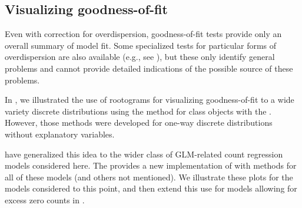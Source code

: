 \documentclass[11pt]{book}\usepackage[]{graphicx}\usepackage[]{color}
\begin{document}
\subsection{Visualizing goodness-of-fit}\label{sec:glm-visfit}

Even with correction for overdispersion, goodness-of-fit tests provide only an overall
summary of model fit.  Some specialized tests for particular forms of overdispersion
are also available (e.g., see \citet[]{CameronTrivedi:1998}),
but these only identify general problems and cannot provide detailed indications of
the possible source of these problems.

In , we illustrated the use of rootograms for visualizing goodness-of-fit
to a wide variety discrete distributions using the  method for
class  objects with the .  However, those methods were
developed for one-way discrete distributions without explanatory variables.

\citet{KleiberZeileis:2014} have generalized this idea to the wider class of
GLM-related count regression models considered here.
The  provides a new implementation of 
with methods for all of these models (and others not mentioned).
We illustrate these plots for the models considered to this point, and then extend
this use for models allowing for excess zero counts in .
\end{document}
